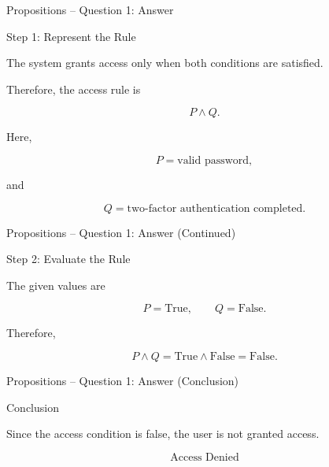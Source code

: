
\begin{frame}{Propositions -- Question 1: Answer}

\begin{exampleblock}{Step 1: Represent the Rule}

The system grants access only when both conditions are satisfied.

Therefore, the access rule is

$$
P\land Q.
$$

Here,

$$
P=\text{valid password},
$$

and

$$
Q=\text{two-factor authentication completed}.
$$

\end{exampleblock}

\end{frame}


\begin{frame}{Propositions -- Question 1: Answer (Continued)}

\begin{exampleblock}{Step 2: Evaluate the Rule}

The given values are

$$
P=\text{True},
\qquad
Q=\text{False}.
$$

Therefore,

$$
P\land Q
=
\text{True}\land\text{False}
=
\text{False}.
$$

\end{exampleblock}

\end{frame}


\begin{frame}{Propositions -- Question 1: Answer (Conclusion)}

\begin{exampleblock}{Conclusion}

Since the access condition is false, the user is not granted access.

$$
\boxed{\text{Access Denied}}
$$

\end{exampleblock}

\end{frame}

